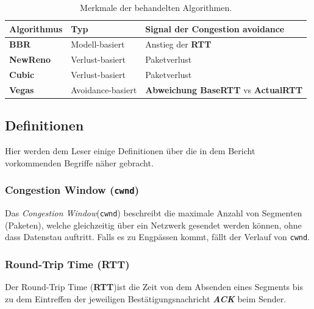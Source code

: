 \documentclass[paper=a4,fontsize=12pt,ngerman]{scrartcl}
\begin{document}
\begin{table}[ht]
    \centering

        \begin{tabular}{l|l|l}

            \hline
            \textbf{Algorithmus} & \textbf{Typ} & \textbf{Signal der Congestion avoidance} \\ \hline

            \textbf{BBR} & Modell-basiert & Anstieg der \textbf{RTT}  \\
            \hline
            \textbf{NewReno} & Verlust-basiert & Paketverlust \\
            \hline
            \textbf{Cubic} & Verlust-basiert  & Paketverlust \\
            \hline
            \textbf{Vegas} & Avoidance-basiert & \textbf{Abweichung BaseRTT} vs \textbf{ActualRTT} \\
            \hline

        \end{tabular}

        \caption{Merkmale der behandelten Algorithmen.}
        \label{tab:algoComp}


\end{table}

\subsection{Definitionen}
Hier werden dem Leser einige Definitionen über die in dem Bericht vorkommenden Begriffe näher gebracht.

\subsubsection{Congestion Window (\texttt{cwnd})} \label{cw-def}
Das \textit{Congestion Window}(\texttt{cwnd}) beschreibt die maximale Anzahl von Segmenten (Paketen), welche gleichzeitig über ein Netzwerk gesendet werden können, ohne 
dass Datenstau auftritt. Falls es zu Engpässen kommt, fällt der Verlauf von \texttt{cwnd}.

\subsubsection{Round-Trip Time (\textbf{RTT})} \label{rtt-def}

Der Round-Trip Time (\textbf{RTT})ist die Zeit von dem Absenden eines Segments bis zu dem Eintreffen der jeweiligen Bestätigungsnachricht \textit{\textbf{ACK}} beim Sender.
\end{document}
